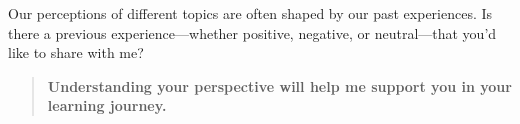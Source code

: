 \documentclass{ximera}
\author{Bart Snapp}
\begin{document}
\begin{question}
    Our perceptions of different topics are often shaped by our past
    experiences.
    Is there a previous experience---whether positive, negative, or
    neutral---that
    you'd like to share with me?

    \begin{quote}
        \textbf{Understanding your perspective will help me support you in your
            learning journey.}
    \end{quote}
    \begin{freeResponse}
    \end{freeResponse}
\end{question}
\end{document}
